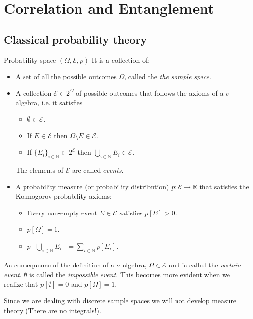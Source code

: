 \chapter{Correlation and Entanglement}
\minitoc
\section{Classical probability theory}
\begin{Definition}{Probability space $(\Omega, \mathcal{E}, p)$}{}
	It is a collection of:
	\begin{itemize}
		\item A set of all the possible outcomes $\Omega$, called the \emph{the sample space}.
		\item A collection $\mathcal{E}\in 2^{\Omega}$ of possible outcomes that follows the axioms of a $\sigma$-algebra, i.e. it satisfies
		      \begin{itemize}
			      \item $\emptyset \in \mathcal{E}$.
			      \item If $E \in \mathcal{E}$ then $\Omega \setminus E \in \mathcal{E}$.
			      \item If $\{E_{i}\}_{i\in \mathbb{N}} \subset 2^\mathcal{E}$ then $\bigcup_{i \in \mathbb{N}}E_i \in \mathcal{E}$.
		      \end{itemize}
		      The elements of $\mathcal{E}$ are called \emph{events}.
		\item A probability measure (or probability distribution) $p \colon \mathcal{E}\to \mathbb{R}$ that satisfies the Kolmogorov probability axioms:
		      \begin{itemize}
			      \item Every non-empty event $E \in \mathcal{E}$ satisfies $p[E]>0$.
			      \item $p[\Omega] = 1$.
			      \item $p\left[\bigcup_{i \in \mathbb{N}}E_i\right] = \sum_{i \in \mathbb{N}}p[E_i]$.
		      \end{itemize}
	\end{itemize}
\end{Definition}
\noindent As consequence of the definition of a $\sigma$-algebra, $\Omega \in \mathcal{E}$ and is called the \emph{certain event}. $\emptyset$ is called the \emph{impossible event}. This becomes more evident when we realize that $p[\emptyset] = 0$ and $p[\Omega] = 1$.
\begin{Note}
	Since we are dealing with discrete sample spaces we will not develop measure theory (There are no integrals!).
\end{Note}
